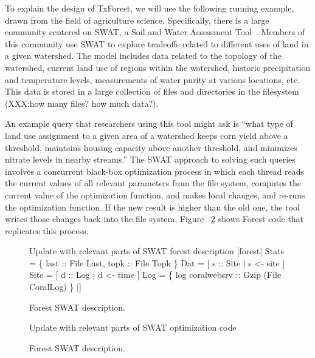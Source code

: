 To explain the design of TxForest, we will use the following running
example, drawn from the field of agriculture science.  Specifically,
there is a large community centered on SWAT, a Soil and Water
Assessment Tool~\cite{SWAT}.  Members of
this community use SWAT to explore tradeoffs related to different uses
of land in a given watershed.  The model includes data related to the
topology of the watershed, current land use of regions within the
watershed, historic precipitation and temperature levels, measurements
of water purity at various locations, etc.  This data is stored in a
large collection of files and directories in the filesystem (XXX:how
many files? how much data?).

An example query that researchers using this tool might ask is
``what type of land use assignment to a given area of a watershed
keeps corn yield above a threshold, maintains housing capacity above
another threshold, and minimizes nitrate levels in nearby streams.''
The SWAT approach to solving such queries involves a concurrent black-box
optimization process in which each thread reads the current values of
all relevant parameters from the file system, computes the current
value of the optimization function, and makes local changes, and re-runs
the optimization function. If the new result is higher than the old
one, the tool writes those changes back into the file system.  Figure
~\ref{fig:SWAT-opt-code} shows Forest code that replicates this process.

\begin{figure}
\begin{code}
Update with relevant parts of SWAT forest description    
[forest|
  Stats = 
   \{ last :: File Last, topk :: File Topk \}
  Dat   = [ s :: Site | s <-  site ]
  Site  = [ d :: Log  | d <-  time ]
  Log = 
   \{ log  coralwebsrv :: Gzip (File CoralLog) \} |]
\end{code}
\caption{Forest SWAT description. }
\label{fig:SWAT-description}
\end{figure}

\begin{figure}
\begin{code}
Update with relevant parts of SWAT optimization code
\end{code}
\caption{Forest SWAT description. }
\label{fig:SWAT-opt-code}
\end{figure}



